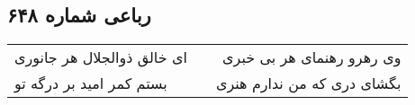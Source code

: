 \begin{center}
\section*{رباعی شماره ۶۴۸}
\label{sec:sh648}
\begin{longtable}{l p{0.5cm} r}
ای خالق ذوالجلال هر جانوری
&&
وی رهرو رهنمای هر بی خبری
\\
بستم کمر امید بر درگه تو
&&
بگشای دری که من ندارم هنری
\\
\end{longtable}
\end{center}

